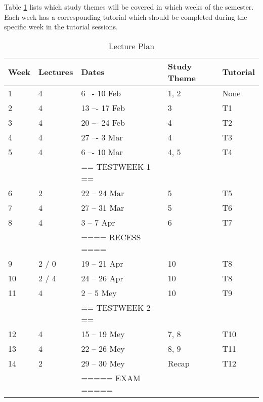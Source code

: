         Table \ref{tab:lec_plan} lists which study themes will be covered
        in which weeks of the semester. Each week has a corresponding tutorial
        which should be completed during the specific week in the tutorial
        sessions.

        \begin{table}[!h]
            \begin{center}
             \begin{tabular}{|l|l|l|l|l|}
                 \hline
                 {\bf Week} & {\bf Lectures} & {\bf Dates} & %
                 {\bf Study Theme} & {\bf Tutorial} \\
                 \hline
                 1  & 4     &  6 –- 10 Feb      & 1, 2  & None \\
                 2  & 4     & 13 –- 17 Feb      & 3     & T1 \\
                 3  & 4     & 20 –- 24 Feb      & 4     & T2 \\
                 4  & 4     & 27 –-  3 Mar      & 4     & T3 \\
                 5  & 4     &  6 –- 10 Mar      & 4, 5  & T4 \\
                    &       & == TESTWEEK 1 == &       & \\
                 6  & 2     & 22 -- 24 Mar      & 5     & T5 \\
                 7  & 4     & 27 -- 31 Mar      & 5     & T6 \\
                 8  & 4     &  3 --  7 Apr      & 6     & T7 \\
                    &       & ==== RECESS ==== &       & \\
                 9  & 2 / 0 & 19 -- 21 Apr      & 10    & T8 \\
                 10 & 2 / 4 & 24 -- 26 Apr      & 10    & T8 \\
                 11 & 4     &  2 --  5 Mey      & 10    & T9 \\
                    &       & == TESTWEEK 2 == &       & \\
                 12 & 4     & 15 -- 19 Mey      & 7, 8  & T10 \\
                 13 & 4     & 22 -- 26 Mey      & 8, 9  & T11 \\
                 14 & 2     & 29 -- 30 Mey      & Recap & T12 \\
                    &       & ===== EXAM ===== &       & \\
                 \hline
             \end{tabular}
             \caption{Lecture Plan} \label{tab:lec_plan}
            \end{center}
        \end{table}

